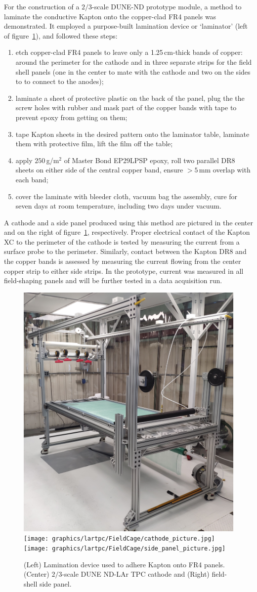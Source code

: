 For the construction of a $2/3$-scale DUNE-ND prototype module, a method to laminate the conductive Kapton onto the copper-clad FR4 panels was demonstrated. It employed a purpose-built lamination device or `laminator' (left of figure~\ref{fig:field_shell_laminations}), and followed these steps:
\begin{enumerate}
    \item etch copper-clad FR4 panels to leave only a 1.25\,cm-thick bands of copper: around the perimeter for the cathode and in three separate strips for the field shell panels (one in the center to mate with the cathode and two on the sides to to connect to the anodes);
    \item laminate a sheet of protective plastic on the back of the panel, plug the the screw holes with rubber and mask part of the copper bands with tape to prevent epoxy from getting on them;
    \item tape Kapton sheets in the desired pattern onto the laminator table, laminate them with protective film, lift the film off the table;
    \item apply $250$\,g/m$^2$ of Master Bond EP29LPSP epoxy, roll two parallel DR8 sheets on either side of the central copper band, ensure $>5\,$mm overlap with each band;
    \item cover the laminate with bleeder cloth, vacuum bag the assembly, cure for seven days at room temperature, including two days under vacuum.
\end{enumerate}
A cathode and a side panel produced using this method are pictured in the center and on the right of figure~\ref{fig:field_shell_laminations}, respectively. Proper electrical contact of the Kapton XC to the perimeter of the cathode is tested by measuring the current from a surface probe to the perimeter. Similarly, contact between the Kapton DR8 and the copper bands is assessed by measuring the current flowing from the center copper strip to either side strips. In the prototype, current was measured in all field-shaping panels and will be further tested in a data acquisition run.

\begin{figure}[htbp]
\centering

\includegraphics[width=.3\linewidth]{graphics/lartpc/FieldCage/laminator.jpg}
\qquad
\texttt{[image: graphics/lartpc/FieldCage/cathode\_picture.jpg]}
\qquad
\texttt{[image: graphics/lartpc/FieldCage/side\_panel\_picture.jpg]}
\caption{(Left) Lamination device used to adhere Kapton onto FR4 panels. (Center) $2/3$-scale DUNE ND-LAr TPC cathode and (Right) field-shell side panel.}
\label{fig:field_shell_laminations}
\end{figure}



